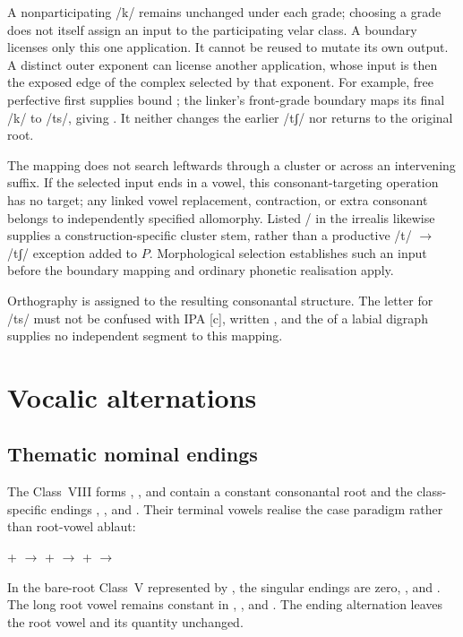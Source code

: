 A nonparticipating /k/ remains unchanged under each grade; choosing a
grade does not itself assign an input to the participating velar class.
A boundary licenses only this one application. It cannot be reused to
mutate its own output. A distinct outer exponent can license another
application, whose input is then the exposed edge of the complex selected
by that exponent. For example, free perfective  first
supplies bound ; the linker's front-grade boundary maps
its final /k/ to /ts/, giving . It neither changes the
earlier /tʃ/ nor returns to the original root.

The mapping does not search leftwards through a cluster or across an
intervening suffix. If the selected input ends in a vowel, this
consonant-targeting operation has no target; any linked vowel replacement,
contraction, or extra consonant belongs to independently specified
allomorphy. Listed / in the irrealis likewise
supplies a construction-specific cluster stem, rather than a productive
/t/ $\rightarrow$ /tʃ/ exception added to \(P\). Morphological selection
establishes such an input before the boundary mapping and ordinary
phonetic realisation apply.

Orthography is assigned to the resulting consonantal structure. The letter
 for /ts/ must not be confused with IPA [c], written ,
and the  of a labial digraph supplies no independent segment
to this mapping.

\section{Vocalic alternations}

\subsection{Thematic nominal endings}\label{sec:thematic-vowels}

The Class~VIII forms , , and  contain a constant consonantal
root  and the class-specific endings , , and
. Their terminal vowels realise the case paradigm rather than
root-vowel ablaut:

\pex
\a {} +  $\rightarrow$ 
\a {} +  $\rightarrow$ 
\a {} +  $\rightarrow$ 
\xe

In the bare-root Class~V represented by , the singular endings are
zero, , and . The long root vowel remains constant in
, , and . The ending alternation leaves the root vowel and its quantity unchanged.

